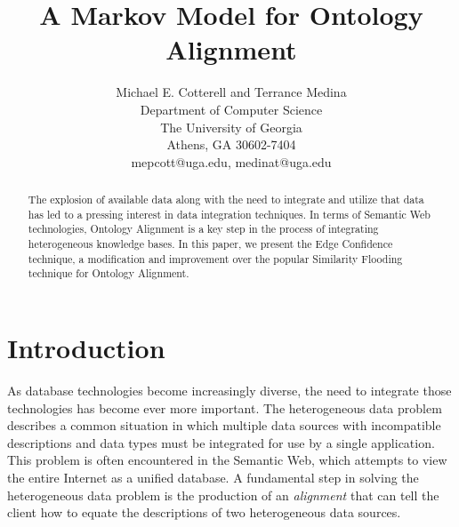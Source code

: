 \documentclass[letterpaper,twocolumn,12pt]{article}
\begin{document}
\newtheorem{defn}{Definition}

\title{A Markov Model for Ontology Alignment}

\author{Michael E. Cotterell and Terrance Medina \\
Department of Computer Science \\
The University of Georgia \\
Athens, GA 30602-7404 \\
mepcott@uga.edu, medinat@uga.edu
}

\maketitle

\begin{abstract}
The explosion of available data along with the need to integrate and utilize that
data has led to a pressing interest in data integration techniques. In terms of
Semantic Web technologies, Ontology Alignment is a key step in the process of 
integrating heterogeneous knowledge bases. In this paper, we present
the Edge Confidence technique, a modification and improvement over the popular
Similarity Flooding technique for Ontology Alignment.

\end{abstract}


\section{Introduction}


As database technologies become increasingly diverse, the need to integrate those technologies has become ever more important. 
The heterogeneous data problem describes a common situation in which multiple data sources with incompatible descriptions and data types must be integrated for use by a single application. 
This problem is often encountered in the Semantic Web, which attempts to view the entire Internet as a unified database. 
A fundamental step in solving the heterogeneous data problem is the production of an \textit{alignment} that can tell the client how to equate the descriptions of two heterogeneous data sources.
\end{document}
